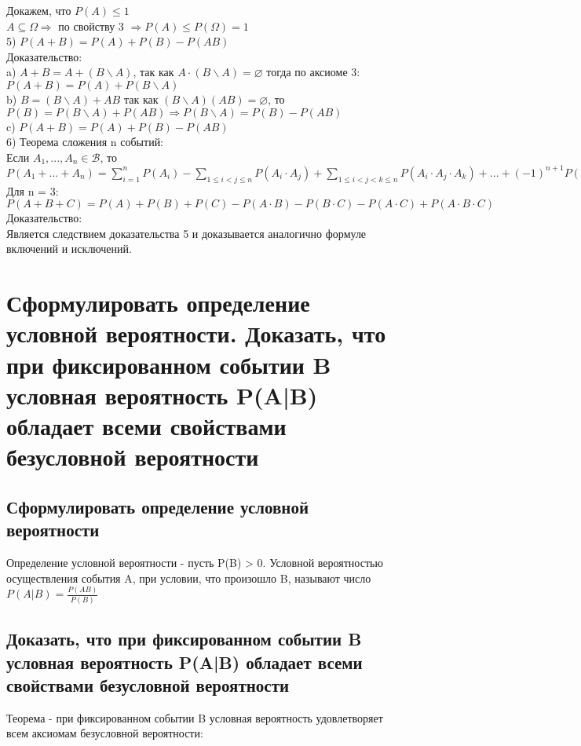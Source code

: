 Докажем, что $P(A) \leqslant 1$\\
$A \subseteq \Omega \Rightarrow $ по свойству 3 $ \Rightarrow P(A) \leqslant P(\Omega) = 1$\\
5) $P(A + B) = P(A) + P(B) - P(AB)$\\
Доказательство:\\
a) $A + B = A + (B \backslash A)$, так как $ A \cdot (B \backslash A) = \varnothing $ тогда по аксиоме 3: $ P(A + B) = P(A) + P(B \backslash A)$\\
b) $ B = (B \backslash A) + AB$ так как $(B \backslash A)(AB) = \varnothing$, то $P(B) = P(B \backslash A) + P(AB) \Rightarrow P(B \backslash A) = P(B) - P(AB)$\\
c) $P(A + B) = P(A) + P(B) - P(AB)$\\
6) Теорема сложения n событий:\\
Если $ A_{1}, ... , A_{n}  \in \mathcal{B} $, то $P(A_{1} + ... + A_{n}) = \sum\limits_{i=1}^{n} P(A_{i}) - \sum\limits_{1 \leqslant i < j \leqslant n} P(A_{i} \cdot A_{j}) + \sum\limits_{1 \leqslant i < j < k \leqslant n} P(A_{i} \cdot A_{j} \cdot A_{k}) + ... + (-1)^{n + 1} P(A_{1} \cdot ... \cdot A_{n})$\\
Для n = 3:\\
$P(A + B + C) = P(A) + P(B) + P(C) - P(A \cdot B) - P(B \cdot C) - P(A \cdot C) + P(A \cdot B \cdot C)$\\
Доказательство:\\
Является следствием доказательства 5 и доказывается аналогично формуле включений и исключений.

\section{Сформулировать определение условной вероятности. Доказать, что при фиксированном событии B условная вероятность P(A|B) обладает всеми свойствами безусловной вероятности}

\subsection{Сформулировать определение условной вероятности}
Определение условной вероятности - пусть P(B) > 0. Условной вероятностью осуществления события A, при условии, что произошло B, называют число  $P(A|B) = \frac{P(AB)}{P(B)}$\\ 

\subsection{Доказать, что при фиксированном событии B условная вероятность P(A|B) обладает всеми свойствами безусловной вероятности}
Теорема - при фиксированном событии B условная вероятность удовлетворяет всем аксиомам безусловной вероятности:\\

